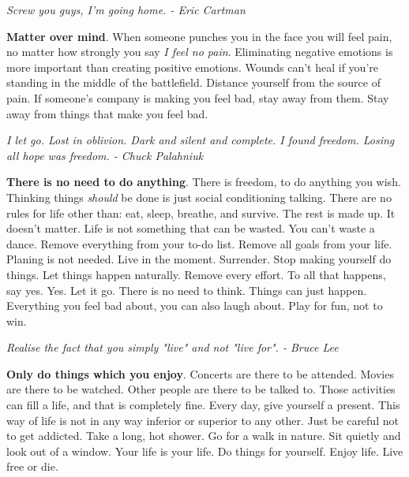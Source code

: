 \documentclass[a4paper,hidelinks]{article}
\begin{document}
\newpage

\begin{center}
\textit{
Screw you guys, I'm going home.  - Eric Cartman
}
\end{center}

\textbf{Matter over mind}.
When someone punches you in the face you will feel pain, no matter how strongly you say \textit{I feel no pain}.
Eliminating negative emotions is more important than creating positive emotions.
Wounds can't heal if you're standing in the middle of the battlefield.
Distance yourself from the source of pain.
If someone's company is making you feel bad, stay away from them.
Stay away from things that make you feel bad.

\newpage

\begin{center}
\textit{
I let go.  Lost in oblivion.  Dark and silent and complete.  I found freedom.  Losing all hope was freedom. - Chuck Palahniuk
}
\end{center}

\textbf{There is no need to do anything}.
There is freedom, to do anything you wish.
Thinking things \textit{should} be done is just social conditioning talking.
There are no rules for life other than: eat, sleep, breathe, and survive.
The rest is made up.
It doesn't matter.
Life is not something that can be wasted.
You can't waste a dance.
Remove everything from your to-do list.
Remove all goals from your life.
Planing is not needed.
Live in the moment.
Surrender.
Stop making yourself do things.
Let things happen naturally.
Remove every effort.
To all that happens, say yes.
Yes.
Let it go.
There is no need to think.
Things can just happen.
Everything you feel bad about, you can also laugh about.
Play for fun, not to win.

\newpage

\begin{center}
\textit{
Realise the fact that you simply "live" and not "live for". - Bruce Lee
}
\end{center}

\textbf{Only do things which you enjoy}.
Concerts are there to be attended.
Movies are there to be watched.
Other people are there to be talked to.
Those activities can fill a life, and that is completely fine.
Every day, give yourself a present.
This way of life is not in any way inferior or superior to any other.
Just be careful not to get addicted.
Take a long, hot shower.
Go for a walk in nature.
Sit quietly and look out of a window.
Your life is your life.
Do things for yourself.
Enjoy life.
Live free or die.
\end{document}
